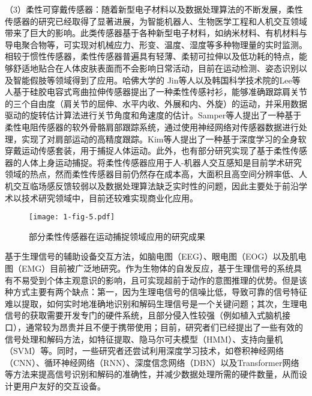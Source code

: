 （3）柔性可穿戴传感器：随着新型电子材料以及数据处理算法的不断发展，柔性传感器的研究已经取得了显著进展，为智能机器人、生物医学工程和人机交互领域带来了巨大的影响。此类传感器基于各种新型电子材料，如纳米材料、有机材料与导电聚合物等，可实现对机械应力、形变、温度、湿度等多种物理量的实时监测。相较于惯性传感器，柔性传感器普遍具有轻薄、柔韧可拉伸以及低功耗的特点，能够舒适地贴合在人体皮肤表面而不会影响日常活动，目前在运动检测、姿态识别以及智能假肢等领域得到了应用。哈佛大学的 Jin等人\cite{jinSoftSensingShirt2020}以及韩国科学技术院的Lee等人\cite{leePrintableSkinAdhesive2016}基于硅胶电容式弯曲拉伸传感器提出了一种柔性传感衬衫，能够准确跟踪肩关节的三个自由度（肩关节的屈伸、水平内收、外展和内、外旋）的运动，并采用数据驱动的旋转估计算法进行关节角度和角速度的估计。Samper等人\cite{samper-escuderoEfficientMultiaxialShoulderMotion2020}提出了一种基于柔性电阻传感器的软外骨骼肩部跟踪系统，通过使用神经网络对传感器数据进行处理，实现了对肩部运动的高精度跟踪。Kim等人\cite{kimDeepFullBodyMotion2019}提出了一种基于深度学习的全身软穿戴运动传感套装，用于捕捉人体运动。此外，也有部分研究\cite{contreras-gonzalezEfficientUpperLimb2020,ogataEstimatingMovementsHuman2019}实现了基于柔性传感器的人体上身运动捕捉。将柔性传感器应用于人-机器人交互感知是目前学术研究领域的热点，然而柔性传感器目前仍然存在成本高，大面积且高空间分辨率低、人机交互临场感反馈较弱以及数据处理算法缺乏实时性的问题，因此主要处于前沿学术以技术研究领域中，目前还较难实现商业化应用。

\begin{figure}[h]
  \centering
  \texttt{[image: 1-fig-5.pdf]}
  \caption{部分柔性传感器在运动捕捉领域应用的研究成果}
  \label{fig:1-4}
\end{figure}

基于生理信号的辅助设备交互方法，如脑电图（EEG）、眼电图（EOG）以及肌电图（EMG）目前被广泛地研究。作为生物体的自发反应，基于生理信号的系统具有不易受到个体主观意识的影响，且可实现超前于动作的意图推理的优势。但是该种方式主要有两个缺点：第一，因为生理电信号的信噪比低，导致可靠的信号特征难以提取，如何实时地准确地识别和解码生理信号是一个关键问题；其次，生理电信号的获取需要开发专门的硬件系统，且部分侵入性较强（例如植入式脑机接口），通常较为昂贵并且不便于携带使用\cite{blabeAssessmentBrainMachine2015,collingerFunctionalPrioritiesAssistive2013}；目前，研究者们已经提出了一些有效的信号处理和解码方法，如特征提取\cite{phinyomarkFeatureExtractionSelection2018}、隐马尔可夫模型（HMM）\cite{chaurasiyaSequentialStudyEmotions2019}、支持向量机（SVM）\cite{richhariyaEEGSignalClassification2018}等。同时，一些研究者还尝试利用深度学习技术，如卷积神经网络（CNN）\cite{briouzaConvolutionalNeuralNetworkBased2021}、循环神经网络（RNN）\cite{suppiahFuzzyInferenceSystem2022}、深度信念网络（DBN）\cite{zhengEEGbasedEmotionClassification2014}以及Transformer网络\cite{montazerinTransformerbasedHandGesture2023,wanEEGformerTransformerBased2023}等方法来提高信号识别和解码的准确性，并减少数据处理所需的硬件数量，从而设计更用户友好的交互设备。

